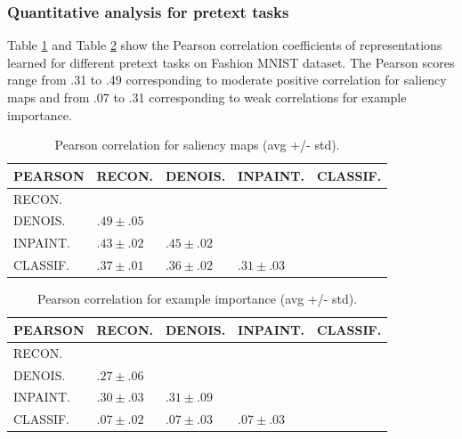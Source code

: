 \subsubsection{Quantitative analysis for pretext tasks}
Table \ref{table:pc_saliency_fmnist} and Table \ref{table:pc_example_fmnist} show the Pearson correlation coefficients of representations learned for different pretext tasks on Fashion MNIST dataset. The Pearson scores range from .31 to .49 corresponding to moderate positive correlation for saliency maps and from .07 to .31 corresponding to weak correlations for example importance.

\begin{table}[H]
    \centering
    \begin{tabular}{lllll}
    \hline
                    PEARSON & RECON. & DENOIS. & INPAINT. & CLASSIF.   \\
    \hline
     \multicolumn{1}{l|}{RECON.}     &  &  &  &   \\
     \multicolumn{1}{l|}{DENOIS.}     & $.49 \pm .05$  & &  &   \\
     \multicolumn{1}{l|}{INPAINT.}   & $.43 \pm .02$  & $.45 \pm .02$ &  &  \\
     \multicolumn{1}{l|}{CLASSIF.}   & $.37 \pm .01$  & $.36 \pm .02$  & $.31 \pm .03$ &    \\
    \hline
    \end{tabular}
\caption{Pearson correlation for saliency maps (avg +/- std).}
\label{table:pc_saliency_fmnist}
\end{table}

\begin{table}[H]
    \centering

    \begin{tabular}{lllll}
    \hline
                    PEARSON & RECON. & DENOIS. & INPAINT.  & CLASSIF.  \\
    \hline
     \multicolumn{1}{l|}{RECON.}     &  &  &  &  \\
     \multicolumn{1}{l|}{DENOIS.}    & $.27 \pm .06$  &  &  &   \\
     \multicolumn{1}{l|}{INPAINT.}   & $.30 \pm .03$  & $.31 \pm .09$ &  &  \\
     \multicolumn{1}{l|}{CLASSIF.}   & $.07 \pm .02$  & $.07 \pm .03$ & $.07 \pm .03$ &  \\
    \hline
    \end{tabular}
    
\caption{Pearson correlation for example importance (avg +/- std).}
\label{table:pc_example_fmnist}
\end{table}

